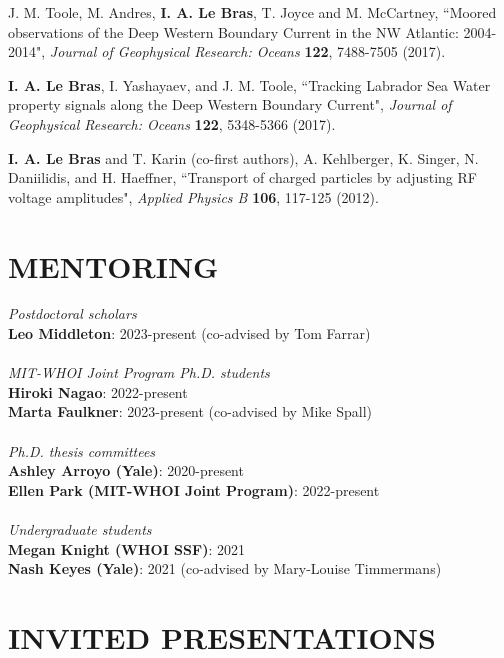 \documentclass[paper=letter,fontsize=11pt]{scrartcl} %
\newcommand{\NewPart}[2]{\section*{\uppercase{#1} #2}}
\newcommand{\ShortEntry}[2]{\normalsize \noindent \textbf{#1}: #2 \\ }
\newcommand{\PaperEntry}[6]{
		\noindent #1, ``#2", \textit{#3} \textbf{#4}, #5 (#6).}
\begin{document}
\begin{etaremune}
\item \PaperEntry{J. M. Toole, M. Andres, \textbf{I. A. Le Bras}, T. Joyce and M. McCartney}{Moored observations of the Deep Western Boundary Current in the NW Atlantic: 2004-2014}{ Journal of Geophysical Research: Oceans}{122}{7488-7505}{2017}

\item \PaperEntry{\textbf{I. A. Le Bras}, I. Yashayaev, and J. M. Toole}{Tracking Labrador Sea Water property signals along the Deep Western Boundary Current}{ Journal of Geophysical Research: Oceans}{122}{5348-5366}{2017}

\item \PaperEntry{\textbf{I. A. Le Bras} and T. Karin (co-first authors), A. Kehlberger, K. Singer, N. Daniilidis, and H. Haeffner}{Transport of charged particles by adjusting RF voltage amplitudes}{Applied Physics B}{106}{117-125}{2012}

\end{etaremune}



\NewPart{Mentoring}{}

\emph{Postdoctoral scholars}\\
\ShortEntry{Leo Middleton}{2023-present (co-advised by Tom Farrar)}\\
\emph{MIT-WHOI Joint Program Ph.D. students}\\
\ShortEntry{Hiroki Nagao}{2022-present}
\ShortEntry{Marta Faulkner}{2023-present (co-advised by Mike Spall)}\\
\emph{Ph.D. thesis committees}\\
\ShortEntry{Ashley Arroyo (Yale)}{2020-present}
\ShortEntry{Ellen Park (MIT-WHOI Joint Program)}{2022-present}\\
\emph{Undergraduate students}\\
\ShortEntry{Megan Knight (WHOI SSF)}{2021}
\ShortEntry{Nash Keyes (Yale)}{2021  (co-advised by Mary-Louise Timmermans)}
\NewPart{Invited presentations}{}
\end{document}
